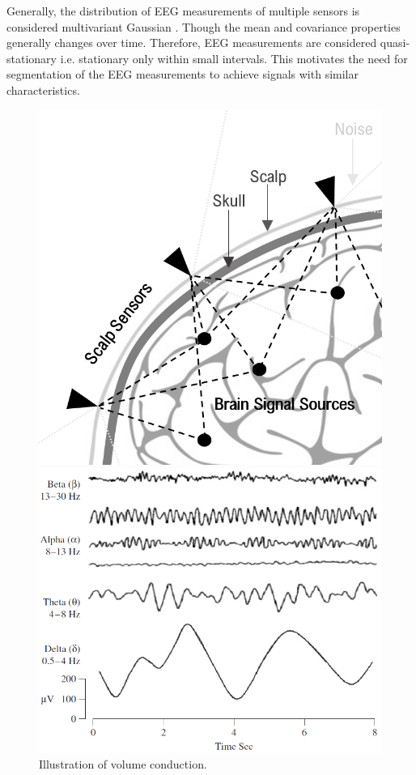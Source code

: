 Generally, the distribution of EEG measurements of multiple sensors is considered multivariant Gaussian \cite[p. 50]{EEGsignalprocessing}. Though the mean and covariance properties generally changes over time. Therefore, EEG measurements are considered quasi-stationary i.e. stationary only within small intervals. This motivates the need for segmentation of the EEG measurements to achieve signals with similar characteristics. 

\begin{figure}[H]
    \begin{minipage}[t]{.45\textwidth}
        \centering
        \includegraphics[width=\textwidth]{figures/EEG/volumeconduction.png}
        \caption{Illustration of volume conduction.}\label{fig:volumeconduction}
    \end{minipage} 
    \hfill
    \begin{minipage}[t]{.45\textwidth}
        \centering
        \includegraphics[width=\textwidth]{figures/EEG/EEG_example.png}

\end{minipage}
\end{figure}
